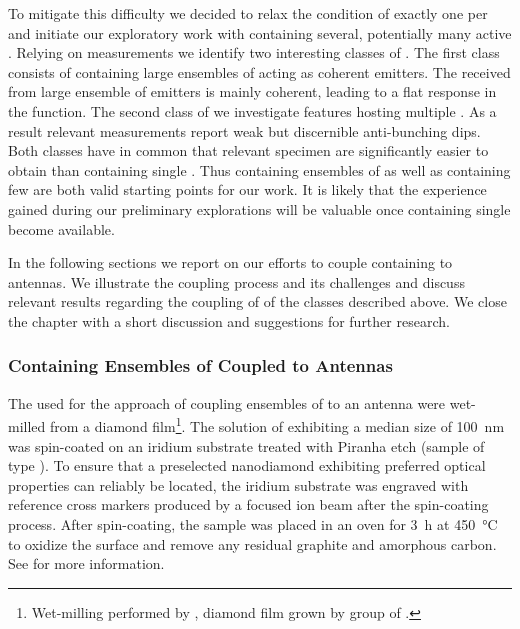 		To mitigate this difficulty we decided to relax the condition of exactly one \siv per \nd and initiate our exploratory work with \nds containing several, potentially many active \sivs.
		Relying on \gt measurements we identify two interesting classes of \nds.
		The first class consists of \nds containing large ensembles of \sivs acting as coherent emitters.
		The \fl received from large ensemble of emitters is mainly coherent, leading to a flat response in the \gtz function.
		The second class of \nds we investigate features \nds hosting multiple \sivs.
		As a result relevant \gtz measurements report weak but discernible anti-bunching dips.
		Both classes have in common that relevant \nd specimen are significantly easier to obtain than \nds containing single \sivs.
		Thus \nds containing ensembles of \sivs as well as \nds containing few \sivs are both valid starting points for our work.
		It is likely that the experience gained during our preliminary explorations will be valuable once \nds containing single \sivs become available.
		
		In the following sections we report on our efforts to couple \nds containing \sivs to antennas. We illustrate the coupling process and its challenges and discuss relevant results regarding the coupling of \nds of the classes described above. We close the chapter with a short discussion and suggestions for further research.

		\FloatBarrier

		\subsubsection{\Nds Containing Ensembles of \sivs Coupled to Antennas}\label{subsubsec::antenna_multiple_sivs}

			The \nds used for the approach of coupling ensembles of \sivs to an antenna were wet-milled from a \CVD diamond film\footnote{Wet-milling performed by \muzha, diamond film grown by group of \williams.}.
			The solution of \nds exhibiting a median size of \SI{100}{nm} was spin-coated on an iridium substrate treated with Piranha etch (sample of type \insituH).
			To ensure that a preselected nanodiamond exhibiting preferred optical properties can reliably be located, the iridium substrate was engraved with reference cross markers produced by a focused ion beam after the spin-coating process.
			After spin-coating, the sample was placed in an oven for \SI{3}{\hour} at \SI{450}{\celsius} to oxidize the surface and remove any residual graphite and amorphous carbon. See  for more information.
			
